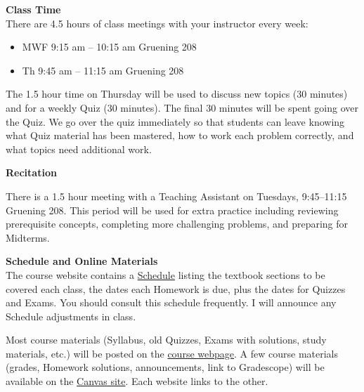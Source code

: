 \documentclass[12pt]{article}
\renewcommand{\emph}[1]{\textsf{\textbf{#1}}}
\newcommand{\localhead}[1]{\par\smallskip\textbf{#1} \smallskip\nobreak\\}%
\def\heading#1{\localhead{\large\emph{#1}}}
\begin{document}
\heading{Class Time}
There are 4.5 hours of class meetings with your instructor every week:
\begin{itemize}
\item MWF 9:15 am -- 10:15 am  Gruening 208
\item Th 9:45 am -- 11:15 am  Gruening 208
\end{itemize}

The 1.5 hour time on Thursday will be used to discuss new topics (30 minutes) and for a weekly Quiz (30 minutes).  The final 30 minutes will be spent going over the Quiz.  We go over the quiz immediately so that students can leave knowing what Quiz material has been mastered, how to work each problem correctly, and what topics need additional work. 

\clearpage\newpage

\strut \vspace{-12pt}

\heading{Recitation}

\vspace*{-0.3in}

There is a 1.5 hour meeting with a Teaching Assistant on Tuesdays, 9:45--11:15 Gruening 208. This period will be used for extra practice including reviewing prerequisite concepts, completing more challenging problems, and preparing for Midterms.



\heading{Schedule and Online Materials}
The course website contains a \href{https://docs.google.com/spreadsheets/d/e/2PACX-1vTJV11ILVouSFriJJQo6VS7-qBGvXBt6gtQNPTmmScJuiknursixGxHQf12yrBgwkJqETFn31EgQRia/pubhtml}{Schedule} listing the textbook sections to be covered each class, the dates each Homework is due, plus the dates for Quizzes and Exams. You should consult this schedule frequently.  I will announce any Schedule adjustments in class.

Most course materials (Syllabus, old Quizzes, Exams with solutions, study materials, etc.) will be posted on the \href{https://uaf-math251.github.io/calc2/}{course webpage}.  A few course materials (grades, Homework solutions, announcements, link to Gradescope) will be available on the \href{https://north.open.uaf.edu/login/}{Canvas site}.  Each website links to the other.
\end{document}
